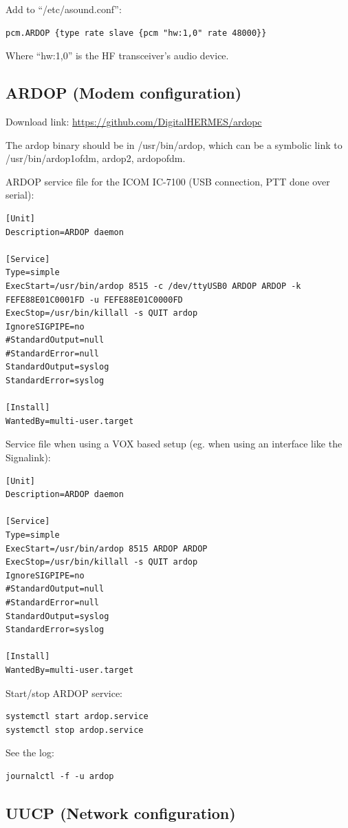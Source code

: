 \documentclass[11pt,a4paper]{article}
\begin{document}
Add to ``/etc/asound.conf'':
\begin{verbatim}
pcm.ARDOP {type rate slave {pcm "hw:1,0" rate 48000}}
\end{verbatim}

Where ``hw:1,0'' is the HF transceiver's audio device.

\subsection{ARDOP (Modem configuration)}

Download link: \url{https://github.com/DigitalHERMES/ardopc}

The ardop binary should be in /usr/bin/ardop, which can be a
symbolic link to /usr/bin/{ardop1ofdm, ardop2, ardopofdm}.

ARDOP service file for the ICOM IC-7100 (USB connection, PTT done over serial):
\begin{verbatim}
[Unit]
Description=ARDOP daemon

[Service]
Type=simple
ExecStart=/usr/bin/ardop 8515 -c /dev/ttyUSB0 ARDOP ARDOP -k FEFE88E01C0001FD -u FEFE88E01C0000FD
ExecStop=/usr/bin/killall -s QUIT ardop
IgnoreSIGPIPE=no
#StandardOutput=null
#StandardError=null
StandardOutput=syslog
StandardError=syslog

[Install]
WantedBy=multi-user.target
\end{verbatim}

Service file when using a VOX based setup (eg. when using an interface like
the Signalink):
\begin{verbatim}
[Unit]
Description=ARDOP daemon

[Service]
Type=simple
ExecStart=/usr/bin/ardop 8515 ARDOP ARDOP
ExecStop=/usr/bin/killall -s QUIT ardop
IgnoreSIGPIPE=no
#StandardOutput=null
#StandardError=null
StandardOutput=syslog
StandardError=syslog

[Install]
WantedBy=multi-user.target
\end{verbatim}


Start/stop ARDOP service:
\begin{verbatim}
systemctl start ardop.service
systemctl stop ardop.service
\end{verbatim}


See the log:
\begin{verbatim}
journalctl -f -u ardop
\end{verbatim}

\subsection{UUCP (Network configuration)}
\end{document}
